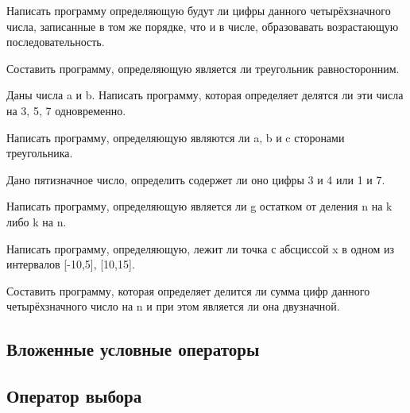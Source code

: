\task Написать программу определяющую будут ли цифры данного
четырёхзначного числа, записанные в том же порядке, что и в числе,
образовавать возрастающую последовательность.

\task Составить программу, определяющую является ли треугольник
равносторонним.

\task Даны числа a и b. Написать программу, которая определяет делятся
ли эти числа на 3, 5, 7 одновременно.

\task Написать программу, определяющую являются ли a, b и c сторонами
треугольника.

\task Дано пятизначное число, определить содержет ли оно цифры 3 и 4
или 1 и 7.

\task Написать программу, определяющую является ли g остатком от
деления n на k либо k на n.

\task Написать программу, определяющую, лежит ли точка с абсциссой x в
одном из интервалов [-10,5], [10,15].

\task Составить программу, которая определяет делится ли сумма цифр
данного четырёхзначного число на n и при этом является ли она
двузначной.

\subsection{Вложенные условные операторы}

\subsection{Оператор выбора}
